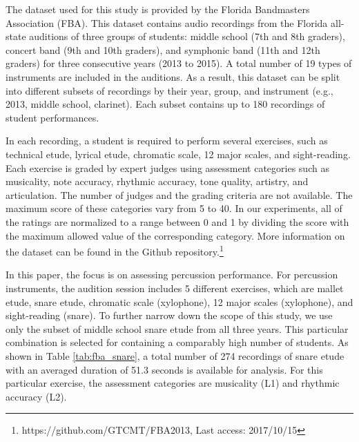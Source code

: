 \documentclass[conference]{IEEEtran}
\begin{document}


The dataset used for this study is provided by the Florida Bandmasters Association (FBA). This dataset contains audio recordings from the Florida all-state auditions of three groups of students: middle school (7th and 8th graders), concert band (9th and 10th graders), and symphonic band (11th and 12th graders) for three consecutive years (2013 to 2015). A total number of 19 types of instruments are included in the auditions. As a result, this dataset can be split into different subsets of recordings by their year, group, and instrument (e.g., 2013, middle school, clarinet). Each subset contains up to 180 recordings of student performances.  

In each recording, a student is required to perform several exercises, such as technical etude, lyrical etude, chromatic scale, 12 major scales, and sight-reading. Each exercise is graded by expert judges using assessment categories such as musicality, note accuracy, rhythmic accuracy, tone quality, artistry, and articulation. The number of judges and the grading criteria are not available. The maximum score of these categories vary from 5 to 40. In our experiments, all of the ratings are normalized to a range between 0 and 1 by dividing the score with the maximum allowed value of the corresponding category. %
More information on the dataset can be found in the Github repository.\footnote{https://github.com/GTCMT/FBA2013, Last access: 2017/10/15}%

In this paper, the focus is on assessing percussion performance. For percussion instruments, the audition session includes 5 different exercises, which are mallet etude, snare etude, chromatic scale (xylophone), 12 major scales (xylophone), and sight-reading (snare). To further narrow down the scope of this study, we use only the subset of middle school snare etude from all three years. This particular combination is selected for containing a comparably high number of students. As shown in Table \ref{tab:fba_snare}, a total number of 274 recordings of snare etude with an averaged duration of 51.3 seconds is available for analysis. For this particular exercise, the assessment categories are musicality (L1) and rhythmic accuracy (L2).
\end{document}
